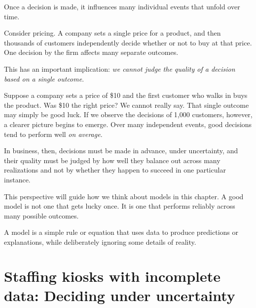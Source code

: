 \documentclass[
  12pt,
  letterpaper,
  DIV=11,
  numbers=noendperiod]{scrreprt}
\begin{document}
Once a decision is made, it influences many individual events that
unfold over time.

Consider pricing. A company sets a single price for a product, and then
thousands of customers independently decide whether or not to buy at
that price. One decision by the firm affects many separate outcomes.

This has an important implication: \emph{we cannot judge the quality of
a decision based on a single outcome}.

Suppose a company sets a price of \$10 and the first customer who walks
in buys the product. Was \$10 the right price? We cannot really say.
That single outcome may simply be good luck. If we observe the decisions
of 1,000 customers, however, a clearer picture begins to emerge. Over
many independent events, good decisions tend to perform well \emph{on
average}.

In business, then, decisions must be made in advance, under uncertainty,
and their quality must be judged by how well they balance out across
many realizations and not by whether they happen to succeed in one
particular instance.

This perspective will guide how we think about models in this chapter. A
good model is not one that gets lucky once. It is one that performs
reliably across many possible outcomes.

\begin{tcolorbox}[enhanced jigsaw, colback=white, leftrule=.75mm, toprule=.15mm, bottomtitle=1mm, breakable, coltitle=black, toptitle=1mm, title=\textcolor{quarto-callout-important-color}{\faExclamation}\hspace{0.5em}{Definition of model for our present purposes}, opacitybacktitle=0.6, colbacktitle=quarto-callout-important-color!10!white, arc=.35mm, left=2mm, colframe=quarto-callout-important-color-frame, titlerule=0mm, rightrule=.15mm, bottomrule=.15mm, opacityback=0]

A model is a simple rule or equation that uses data to produce
predictions or explanations, while deliberately ignoring some details of
reality.

\end{tcolorbox}

\section{Staffing kiosks with incomplete data: Deciding under
uncertainty}\label{sec-mean-game}
\end{document}

